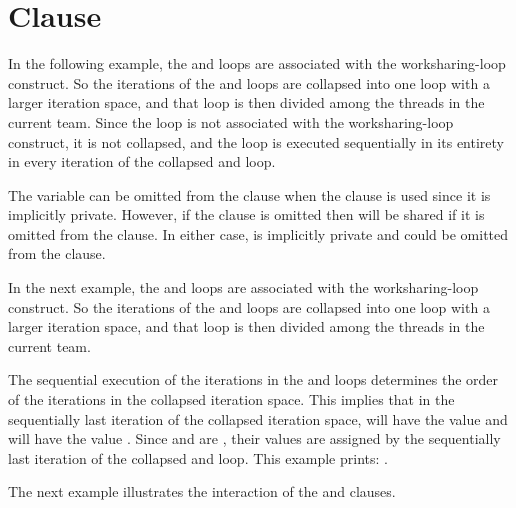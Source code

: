 \section{ Clause}
\label{sec:collapse}

In the following example, the  and  loops are associated with 
the worksharing-loop construct. So the iterations of the  and  loops are 
collapsed into one loop with a larger iteration space, and that loop is then divided 
among the threads in the current team. Since the  loop is not associated 
with the worksharing-loop construct, it is not collapsed, and the  loop is executed 
sequentially in its entirety in every iteration of the collapsed  and 
 loop. 

The variable  can be omitted from the   clause when the 
 clause is used since it is implicitly private. However, if the 
 clause is omitted then  will be shared if it is omitted 
from the  clause. In either case,  is implicitly private 
and could be omitted from the   clause.



In the next example, the  and  loops are associated with the 
worksharing-loop construct. So the iterations of the  and  loops are collapsed 
into one loop with a larger iteration space, and that loop is then divided among 
the threads in the current team.

The sequential execution of the iterations in the  and  loops 
determines the order of the iterations in the collapsed iteration space. This implies 
that in the sequentially last iteration of the collapsed iteration space,  
will have the value  and  will have the value . Since 
 and  are , their values are assigned 
by the sequentially last iteration of the collapsed  and  loop. 
This example prints: .



The next example illustrates the interaction of the  and  
 clauses.

